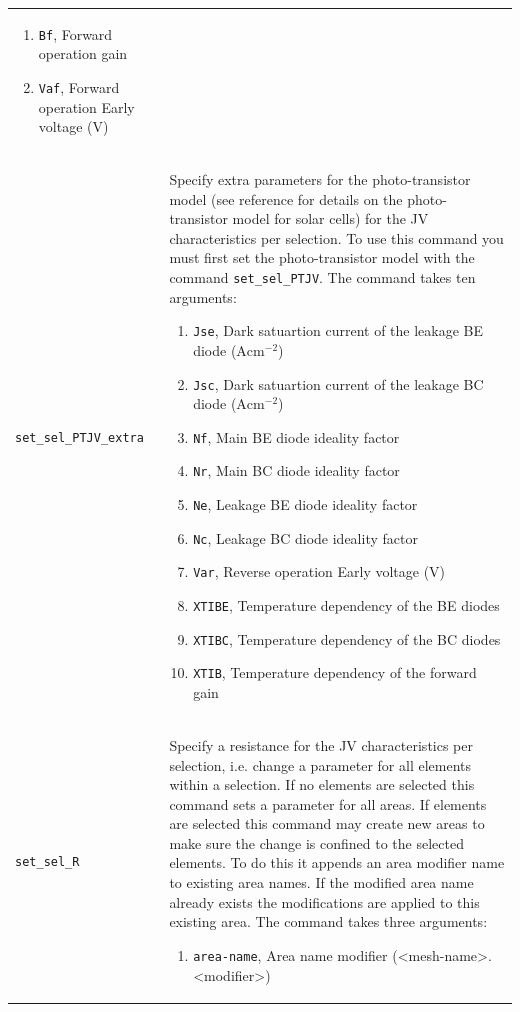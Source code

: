 \documentclass[noshowpacs,preprintnumbers,amsmath,amssymb, letter]{revtex4}
\begin{document}
\begin{longtable}{p{}p{}}
\begin{enumerate}
\item \texttt{Bf},  Forward operation gain 
\item \texttt{Vaf},  Forward operation Early voltage (V)
\end{enumerate}\\
\texttt{set\_sel\_PTJV\_extra}	&  Specify extra parameters for the photo-transistor model (see reference \cite{Walter:photo-T} for details on the photo-transistor model for solar cells) for the JV characteristics per selection. To use this command you must first set the photo-transistor model with the command \texttt{set\_sel\_PTJV}. The command takes ten arguments:
\begin{enumerate}
\item \texttt{Jse},  Dark satuartion current of the leakage BE diode ($\text{A}\text{cm}^{-2}$)
\item \texttt{Jsc},  Dark satuartion current of the leakage BC diode ($\text{A}\text{cm}^{-2}$)
\item \texttt{Nf},  Main BE diode ideality factor 
\item \texttt{Nr},  Main BC diode ideality factor 
\item \texttt{Ne},  Leakage BE diode ideality factor 
\item \texttt{Nc},  Leakage BC diode ideality factor
\item \texttt{Var},  Reverse operation Early voltage (V)
\item \texttt{XTIBE},  Temperature dependency of the BE diodes 
\item \texttt{XTIBC},  Temperature dependency of the BC diodes 
\item \texttt{XTIB},  Temperature dependency of the forward gain 
\end{enumerate}\\
\texttt{set\_sel\_R}	&  Specify a resistance for the JV characteristics per selection, i.e. change a parameter for all elements within a selection. If no elements are selected this command sets a parameter for all areas. If elements are selected this command may create new areas to make sure the change is confined to the selected elements. To do this it appends an area modifier name to existing area names. If the modified area name already exists the modifications are applied to this existing area. The command takes three arguments:
\begin{enumerate}
\item \texttt{area-name}, Area name modifier (\textless mesh-name\textgreater .\textless modifier\textgreater )

\end{enumerate}
\end{longtable}
\end{document}

